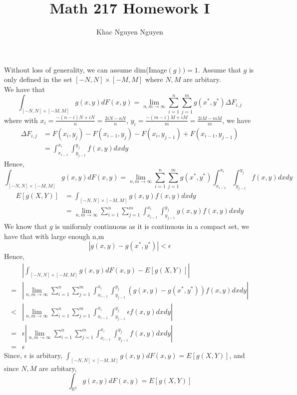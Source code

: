 \documentclass[11pt]{article}
\title{\textbf{Math 217 Homework I}}
\author{Khac Nguyen Nguyen}
\date{}
\begin{document}
\tableofcontents
\pagebreak
\section{}
Without loss of generality, we can assume dim(Image$(g)) = 1$.
Assume that $g$ is only defined in the set $[-N,N] \times [-M,M]$ where $N,M$ are arbitary. \\
We have that 
\[
    \int_{[-N,N] \times [-M,M]} g(x,y) dF(x,y) = \lim_{n,m \to \infty} \sum_{i=1}^n \sum_{j=1}^m g(x^*, y^*) \Delta F_{i,j}
\]
where with $x_i = \frac{-(n-i)N + iN}{n} = \frac{2iN - nN}{n}$, $y_i = \frac{-(m-i)M + iM}{m} = \frac{2iM - mM}{m}$, we have
\begin{equation*}
    \begin{aligned}
        \Delta F_{i,j} &= F(x_i, y_j) - F(x_{i-1}, y_j) - F(x_i, y_{j-1}) + F(x_{i-1}, y_{j-1}) \\
        &= \int_{x_{i-1}}^{x_i} \int_{y_{j-1}}^{y_j} f(x,y) dxdy
    \end{aligned}
\end{equation*}
Hence, 
\[
    \int_{[-N,N] \times [-M,M]} g(x,y) dF(x,y) = \lim_{n,m \to \infty} \sum_{i=1}^n \sum_{j=1}^m g(x^*, y^*) \int_{x_{i-1}}^{x_i} \int_{y_{j-1}}^{y_j} f(x,y) dxdy
\]
\begin{equation*}
    \begin{aligned}
        E[g(X,Y)] &= \int_{[-N,N] \times [-M,M]} g(x,y) f(x,y) dxdy \\
        &=  \lim_{n,m \to \infty} \sum_{i=1}^n \sum_{j=1}^m \int_{x_{i-1}}^{x_i} \int_{y_{j-1}}^{y_j} g(x, y) f(x,y) dxdy 
    \end{aligned}
\end{equation*}
We know that $g$ is uniformly continuous as it is continuous in a compact set, we have that with large enough n,m
\[
    | g(x,y) - g(x^*, y^*) | < \epsilon
\]
Hence, 
\begin{equation*}
    \begin{aligned}
        & \left| \int_{[-N,N] \times [-M,M]} g(x,y) dF(x,y)  - E[g(X,Y)] \right| \\
        =&  \left| \lim_{n,m \to \infty} \sum_{i=1}^n \sum_{j=1}^m  \int_{x_{i-1}}^{x_i} \int_{y_{j-1}}^{y_j} (g(x, y) - g(x^*,y^*)) f(x,y)  dxdy \right| \\
        <& \left| \lim_{n,m \to \infty} \sum_{i=1}^n \sum_{j=1}^m  \int_{x_{i-1}}^{x_i} \int_{y_{j-1}}^{y_j} \epsilon f(x,y)  dxdy \right| \\
        =& \epsilon \left|\lim_{n,m \to \infty} \sum_{i=1}^n \sum_{j=1}^m  \int_{x_{i-1}}^{x_i} \int_{y_{j-1}}^{y_j} f(x,y)  dxdy \right| \\
        =& \epsilon
    \end{aligned}
\end{equation*}
Since, $\epsilon$ is arbitary, $\int_{[-N,N] \times [-M,M]} g(x,y) dF(x,y)  = E[g(X,Y)]$, and since $N,M$ are arbitary,
\[
    \int_{\mathbb{R}^2} g(x,y) dF(x,y)  = E[g(X,Y)]
\]
\pagebreak
\end{document}
